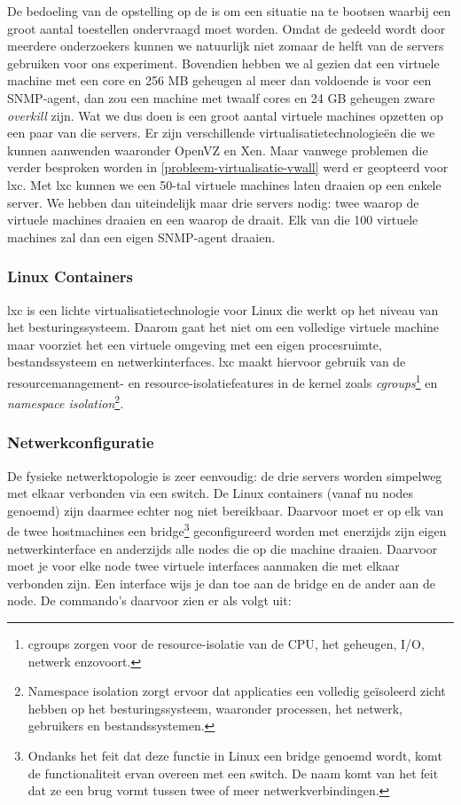 De bedoeling van de opstelling op de \vwall{}  is om een situatie na te bootsen waarbij een groot aantal toestellen ondervraagd moet worden.
Omdat de \vwall{} gedeeld wordt door meerdere onderzoekers kunnen we natuurlijk niet zomaar de helft van de servers gebruiken voor ons experiment.
Bovendien hebben we al gezien dat een virtuele machine met een core en 256 MB geheugen al meer dan voldoende is voor een SNMP-agent,
dan zou een machine met twaalf cores en 24 GB geheugen zware \textit{overkill} zijn.
Wat we dus doen is een groot aantal virtuele machines opzetten op een paar van die servers.
Er zijn verschillende virtualisatietechnologieën die we kunnen aanwenden waaronder OpenVZ en Xen.
Maar vanwege problemen die verder besproken worden in \cref{probleem-virtualisatie-vwall} werd er geopteerd voor \gls{lxc}.
Met \gls{lxc} kunnen we een 50-tal virtuele machines laten draaien op een enkele server.
We hebben dan uiteindelijk maar drie servers nodig: twee waarop de virtuele machines draaien en een waarop de \nwmretriever{} draait.
Elk van die 100 virtuele machines zal dan een eigen SNMP-agent draaien.

\subsubsection{Linux Containers}
\label{lxc}

\gls{lxc} is een lichte virtualisatietechnologie voor Linux die werkt op het niveau van het besturingssysteem.
Daarom gaat het niet om een volledige virtuele machine maar voorziet het een virtuele omgeving met een eigen procesruimte, bestandssysteem en netwerkinterfaces.
\gls{lxc} maakt hiervoor gebruik van de resourcemanagement- en resource-isolatiefeatures in de kernel zoals \textit{\gls{cgroups}}\footnote{
	\gls{cgroups} zorgen voor de resource-isolatie van de CPU, het geheugen, I/O, netwerk enzovoort\cite{lxc-wiki}.
} en \textit{namespace isolation}\footnote{
	Namespace isolation zorgt ervoor dat applicaties een volledig geïsoleerd zicht hebben op het besturingssysteem,
	waaronder processen, het netwerk, gebruikers en bestandssystemen\cite{lxc-wiki}.
}\cite{lxc-explained, lxc-wiki}.


\subsubsection{Netwerkconfiguratie}

De fysieke netwerktopologie is zeer eenvoudig: de drie servers worden simpelweg met elkaar verbonden via een switch.
De Linux containers (vanaf nu nodes genoemd) zijn daarmee echter nog niet bereikbaar.
Daarvoor moet er op elk van de twee hostmachines een bridge\footnote{
	Ondanks het feit dat deze functie in Linux een bridge genoemd wordt, komt de functionaliteit ervan overeen met een switch.
	De naam komt van het feit dat ze een brug vormt tussen twee of meer netwerkverbindingen.
} geconfigureerd worden met enerzijds zijn eigen netwerkinterface
en anderzijds alle nodes die op die machine draaien.
Daarvoor moet je voor elke node twee virtuele interfaces aanmaken die met elkaar verbonden zijn.
Een interface wijs je dan toe aan de bridge en de ander aan de node\cite{lxc-config}.
De commando's daarvoor zien er als volgt uit:

